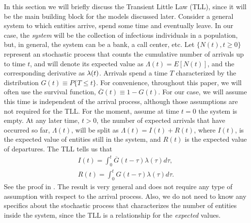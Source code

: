 \documentclass[USenglish,10pt]{article}
\newcommand{\Gb}{\overline{G}\xspace}
\newcommand{\la}{\ensuremath\lambda\xspace}
\begin{document}
In this section we will briefly discuss the Transient Little Law (TLL)\cite{fral.ea:tll}, since it will be the main building block for the models discussed later.
Consider a general system to which entities arrive, spend some time and eventually leave. In our case, the \emph{system} will be the collection of infectious individuals in a population, but, in general, the system can be a bank, a call center, etc.
Let $\{N(t),t\geq 0\}$ represent an stochastic process that counts the cumulative number of arrivals  up to time $t$, and will denote its expected value as $\Lambda(t)=E[N(t)]$, and the corresponding derivative as $\la(t)$.
Arrivals spend a time $T$ characterized by the distribution  $G(t) \equiv P\{T\leq t\}$.
For convenience, throughout this paper, we will often use the survival function, $\Gb(t) \equiv 1-G(t)$.
For our case, we will assume this time is independent of the arrival process, although those assumptions are not required for the TLL.
For the moment, assume at time $t=0$ the system is empty. At any later time, $t>0$, the number of expected arrivals that have occurred so far, $\Lambda(t)$, will be split as $\Lambda(t)=I(t)+R(t)$, where  $I(t)$, is the expected value of entities still in the system, and  $R(t)$ is the expected value of departures. The TLL tells us that
\begin{align}
I(t) = \int_0^t \Gb(t-\tau) \lambda(\tau)d\tau,   \label{eq:tll0_i} \\
R(t) = \int_0^t G(t-\tau)  \lambda(\tau)d\tau .  \label{eq:tll0_r}
\end{align}
See the proof in \cite{fral.ea:tll}.
The result is very general and does not require any type of assumption with respect to the arrival process.
Also, we do not need to know any specifics about the stochastic process that characterizes the number of entities inside the system, since the TLL is a relationship for the \emph{expected} values.
\end{document}
